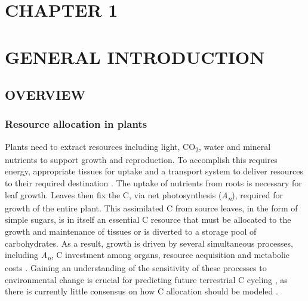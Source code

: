 \documentclass[a4paper]{article}
\begin{document}
\clearpage
\section*{CHAPTER 1 \\ \mbox{ }\\ GENERAL INTRODUCTION}
\subsection*{OVERVIEW}

\subsubsection*{Resource allocation in plants}
Plants need to extract resources including light, CO\textsubscript{2}, water and mineral nutrients to support growth and reproduction. To accomplish this requires energy, appropriate tissues for uptake and a transport system to deliver resources to their required destination \citep{grace1997allocation}. The uptake of nutrients from roots is necessary for leaf growth. Leaves then fix the C, via net photosynthesis (\textit{A\textsubscript{n}}), required for growth of the entire plant. This assimilated C from source leaves, in the form of simple sugars, is in itself an essential C resource that must be allocated to the growth and maintenance of tissues or is diverted to a storage pool of carbohydrates. As a result, growth is driven by several simultaneous processes, including \textit{A\textsubscript{n}}, C investment among organs, resource acquisition and metabolic costs \citep{korner2006plant, fourcaud2008plant}. Gaining an understanding of the sensitivity of these processes to environmental change is crucial for predicting future terrestrial C cycling \citep{friedlingstein1999toward}, as there is currently little consensus on how C allocation should be modeled \citep{franklin2012modeling, de2014does}.
\end{document}
